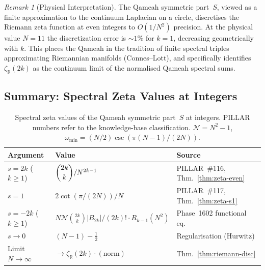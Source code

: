 \documentclass[aps,prd,twocolumn,superscriptaddress,floatfix,nofootinbib]{revtex4-2}
\theoremstyle{definition}
\theoremstyle{remark}
\newtheorem{remark}[theorem]{Remark}
\begin{document}
\begin{remark}[Physical Interpretation]
The Qameah symmetric part~$S$, viewed as a finite approximation to the continuum
Laplacian on a circle, discretises the Riemann zeta function at even integers to
$O(1/N^2)$ precision.  At the physical value $N=11$ the discretization error is
$\sim 1\%$ for $k=1$, decreasing geometrically with $k$.  This places the Qameah
in the tradition of finite spectral triples approximating Riemannian manifolds
(Connes--Lott), and specifically identifies $\zeta_{\mathbb{R}}(2k)$ as the
continuum limit of the normalised Qameah spectral sums.
\end{remark}

\subsection{Summary: Spectral Zeta Values at Integers}
\label{sec:spectral-zeta-summary}

\begin{table}[h]
\centering
\caption{Spectral zeta values of the Qameah symmetric part~$S$ at integers.
PILLAR numbers refer to the knowledge-base classification.
$\mathcal{N} = N^2-1$, $\omega_{\min} = (N/2)\csc(\pi(N-1)/(2N))$.}
\label{tab:zeta-summary}
\begin{tabular}{lll}
\toprule
Argument & Value & Source \\
\midrule
$s = 2k$ ($k \ge 1$) & $\dbinom{2k}{k}/N^{2k-1}$ & PILLAR~\#116, Thm.~\ref{thm:zeta-even} \\[4pt]
$s = 1$ & $2\cot(\pi/(2N))/N$ & PILLAR~\#117, Thm.~\ref{thm:zeta-s1} \\[4pt]
$s = -2k$ ($k \ge 1$) & $N\mathcal{N}\binom{2k}{k}|B_{2k}|/(2k)!\cdot R_{k-1}(N^2)$ & Phase~1602 functional eq.\ \\[4pt]
$s \to 0$ & $(N-1) - \tfrac{1}{2}$ & Regularisation (Hurwitz) \\[4pt]
Limit $N\to\infty$ & $\longrightarrow \zeta_{\mathbb{R}}(2k)\cdot(\text{norm})$ & Thm.~\ref{thm:riemann-disc} \\
\bottomrule
\end{tabular}
\end{table}
\end{document}
